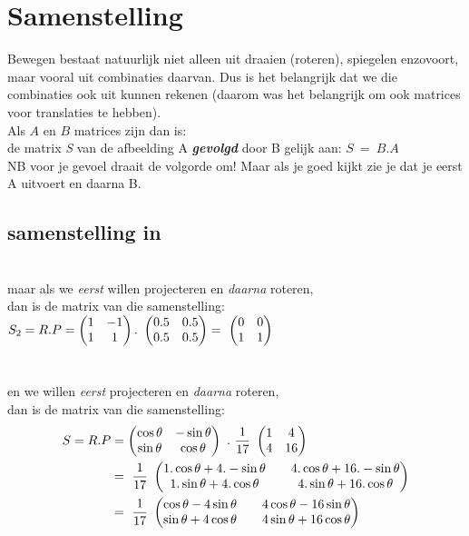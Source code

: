 \section{Samenstelling}		
Bewegen bestaat natuurlijk niet alleen uit draaien (roteren), spiegelen enzovoort, maar vooral uit combinaties daarvan. Dus is het belangrijk dat we die combinaties ook uit kunnen rekenen (daarom was het belangrijk om ook matrices voor translaties te hebben). \\ 
{Als $ A $ en $ B $  matrices zijn dan is:\\
	de matrix\textit{ S }van de afbeelding A \textit{\textbf{gevolgd}} door  B 	gelijk aan:
	\quad $ S\ = \ B . A $ \\ NB voor je gevoel draait de volgorde om! Maar als je goed kijkt zie je dat je eerst A uitvoert en daarna B.}
\subsection{samenstelling in \RT}
 \\
maar als we \textit{eerst} willen  projecteren en \textit{daarna}  roteren, \\ dan is de matrix van die samenstelling:\\
$  S_2 = R.P
= \begin{pmatrix}  1 & -1  \\  1 & 1  \end{pmatrix} . 
\ \begin{pmatrix}  0.5 & 0.5  \\  0.5 & 0.5  \end{pmatrix} 
= \ \begin{pmatrix}  0 & 0  \\  1 & 1  \end{pmatrix}
$ \\ \\ \\
en we willen \textit{eerst} projecteren  en \textit{daarna} roteren, \\
dan is de matrix van die samenstelling: 
\begin{align*} 
S = R.P 
&=	  \mattwee { \cos \theta & -\sin \theta }
{ \sin \theta & \cos \theta}  \ . \ 
\frac{1}{17} \  \mattwee { 1 & 4 }
{ 4  & 16 }  \\
& = \   \frac{1}{17} \  
\mattwee { 1.\cos \theta + 4.-\sin \theta  & & 4.\cos \theta + 16.-\sin \theta  }
{ 1.\sin \theta + 4.\cos \theta &  &4.\sin \theta + 16.\cos \theta}  \\  
& = \   \frac{1}{17} \  
\mattwee { \cos \theta - 4\sin \theta  & & 4\cos \theta - 16\sin \theta  }
{ \sin \theta + 4\cos \theta & & 4\sin \theta + 16\cos \theta}                                                
\end{align*} 

